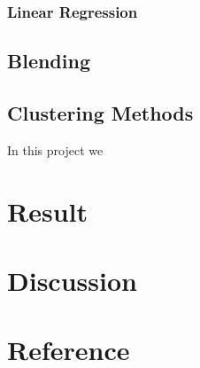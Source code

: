 \documentclass[12pt,a4paper]{article}
\begin{document}
\subsubsection{Linear Regression}

\subsection{Blending}

\subsection{Clustering Methods}
In this project we 

\section{Result}

\section{Discussion}

\section{Reference}
\end{document}
